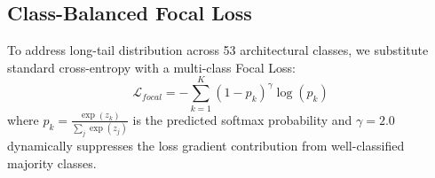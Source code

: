 \subsection{Class-Balanced Focal Loss}
To address long-tail distribution across 53 architectural classes, we substitute standard cross-entropy with a multi-class Focal Loss:
\begin{equation}
    \mathcal{L}_{focal} = - \sum_{k=1}^K (1 - p_k)^\gamma \log(p_k)
\end{equation}
where $p_k = \frac{\exp(z_k)}{\sum_j \exp(z_j)}$ is the predicted softmax probability and $\gamma = 2.0$ dynamically suppresses the loss gradient contribution from well-classified majority classes.
